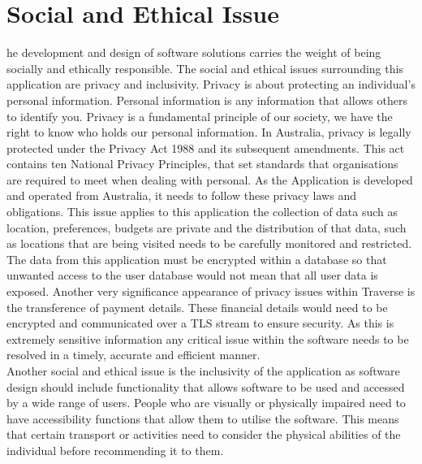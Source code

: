 \let\textcircled=\pgftextcircled
\chapter{Social and Ethical Issue}

he development and design of software solutions carries the weight of being socially and ethically responsible. The social and ethical issues surrounding this application are privacy and inclusivity. Privacy is about protecting an individual’s personal information. Personal information is any information that allows others to identify you. Privacy is a fundamental principle of our society, we have the right to know who holds our personal information. In Australia, privacy is legally protected under the Privacy Act 1988 and its subsequent amendments. This act contains ten National Privacy Principles, that set standards that organisations are required to meet when dealing with personal. As the Application is developed and operated from Australia, it needs to follow these privacy laws and obligations. This issue applies to this application the collection of data such as location, preferences, budgets are private and the distribution of that data, such as locations that are being visited needs to be carefully monitored and restricted. The data from this application must be encrypted within a database so that unwanted access to the user database would not mean that all user data is exposed. Another very significance appearance of privacy issues within Traverse is the transference of payment details. These financial details would need to be encrypted and communicated over a TLS stream to ensure security. As this is extremely sensitive information any critical issue within the software needs to be resolved in a timely, accurate and efficient manner.  \\

Another social and ethical issue is the inclusivity of the application as software design should include functionality that allows software to be used and accessed by a wide range of users. People who are visually or physically impaired need to have accessibility functions that allow them to utilise the software. This means that certain transport or activities need to consider the physical abilities of the individual before recommending it to them.
